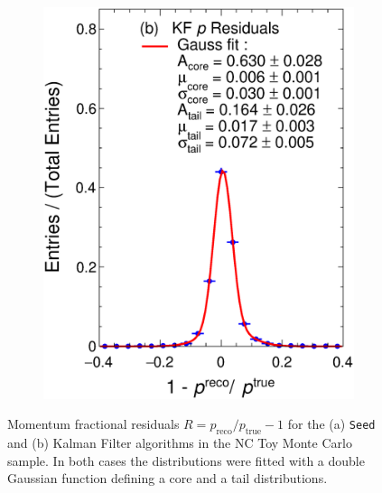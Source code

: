 \begin{figure}[t]
\begin{subfigure}[b]{0.48\textwidth}
         \includegraphics[width=\textwidth]{figures/ch4-KF_NDGArLite/Toy/NoCorr/pResKF_doublegauss.eps}
         \caption{}
         \label{fig:ToyResP_GArLite_NoCorr_KF}
     \end{subfigure}
        \caption{Momentum fractional residuals $R=p_{\text{reco}}/p_{\text{true}} - 1$ for the (a) \texttt{Seed} and (b) Kalman Filter algorithms in the NC Toy Monte Carlo sample. In both cases the distributions were fitted with a double Gaussian function defining a core and a tail distributions.} \label{fig:ToyResP_GArLite_NoCorr}
\end{figure}

